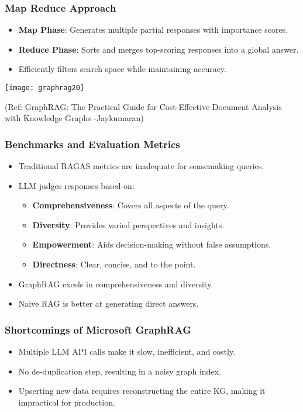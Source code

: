 \begin{frame}[fragile]\frametitle{Map Reduce Approach}
    \begin{itemize}
        \item \textbf{Map Phase}: Generates multiple partial responses with importance scores.
        \item \textbf{Reduce Phase}: Sorts and merges top-scoring responses into a global answer.
        \item Efficiently filters search space while maintaining accuracy.
    \end{itemize}
	
	\begin{center}
	\texttt{[image: graphrag20]}
	
	{\tiny (Ref: GraphRAG: The Practical Guide for Cost-Effective Document Analysis with Knowledge Graphs -Jaykumaran)}
	\end{center}		
\end{frame}



\begin{frame}[fragile]\frametitle{Benchmarks and Evaluation Metrics}
    \begin{itemize}
        \item Traditional RAGAS metrics are inadequate for sensemaking queries.
        \item LLM judges responses based on:
        \begin{itemize}
            \item \textbf{Comprehensiveness}: Covers all aspects of the query.
            \item \textbf{Diversity}: Provides varied perspectives and insights.
            \item \textbf{Empowerment}: Aids decision-making without false assumptions.
            \item \textbf{Directness}: Clear, concise, and to the point.
        \end{itemize}
        \item GraphRAG excels in comprehensiveness and diversity.
        \item Naive RAG is better at generating direct answers.
    \end{itemize}
\end{frame}

\begin{frame}[fragile]\frametitle{Shortcomings of Microsoft GraphRAG}
    \begin{itemize}
        \item Multiple LLM API calls make it slow, inefficient, and costly.
        \item No de-duplication step, resulting in a noisy graph index.
        \item Upserting new data requires reconstructing the entire KG, making it impractical for production.
    \end{itemize}
\end{frame}

